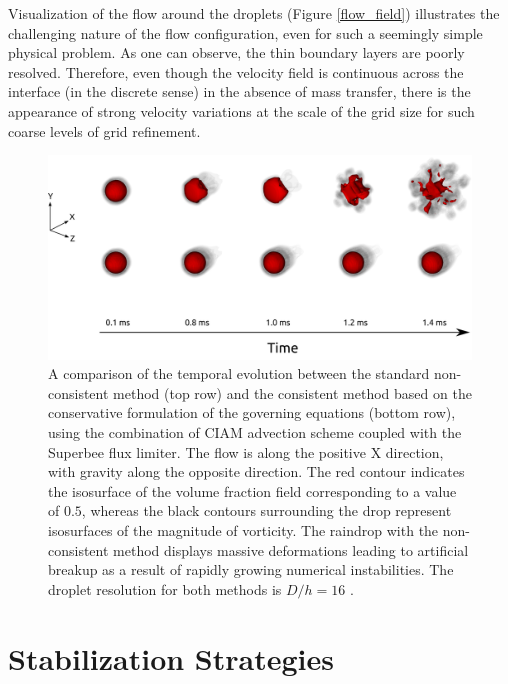 Visualization of the flow around the droplets (Figure \ref{flow_field}) 
illustrates the challenging nature of the flow configuration, 
even for such a seemingly simple physical problem. 
As one can observe, the thin boundary layers are poorly resolved. 
Therefore, even though the velocity field is continuous across the 
interface (in the discrete sense) in the absence of mass transfer, 
there is the appearance of strong velocity variations at the 
scale of the grid size for such coarse levels of grid refinement. 

\begin{figure}
\begin{center}
\includegraphics[width=1.25\textwidth]{plots/raindrop/raindrop_explode.png}
\end{center}
\caption{A comparison of the temporal evolution between the standard 
non-consistent method (top row) and the consistent method based on the 
conservative formulation of the governing equations (bottom row), 
using the combination of CIAM advection scheme coupled with the Superbee flux limiter. 
The flow is along the positive X direction, with gravity along the opposite direction. 
The red contour indicates the isosurface of the volume fraction 
field corresponding to a value of $0.5$, whereas the black contours 
surrounding the drop represent isosurfaces of the magnitude of vorticity. 
The raindrop with the non-consistent method displays massive deformations 
leading to artificial breakup as a result of rapidly growing numerical instabilities. 
The droplet resolution for both methods is $D/h = 16$ .}
\label{explode_compare}
\end{figure}



\section{Stabilization Strategies}

